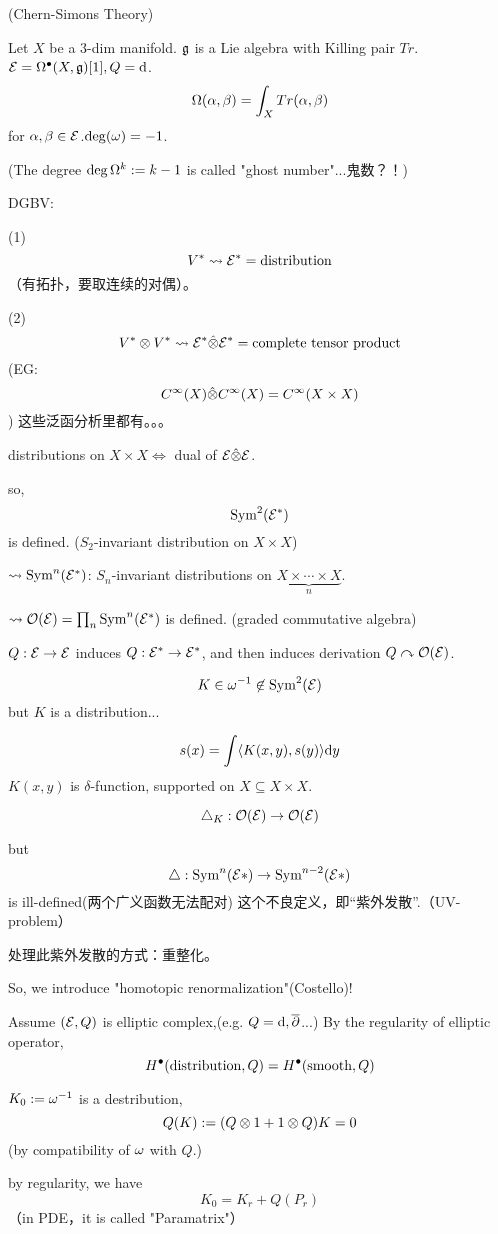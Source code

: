 \begin{example}(Chern-Simons Theory)

Let $X$ be a $3$-dim manifold. $\mathfrak{g}$ is a Lie algebra
with Killing pair $Tr$. $\mathcal{E}=\Omega^{\bullet}(X,\mathfrak{g})[1],Q=\mathrm{d}$.
$$\Omega(\alpha,\beta)=\int_XTr(\alpha,\beta)$$
for $\alpha,\beta\in\mathcal{E}$.$\deg(\omega)=-1$.
\end{example}
(The degree $\deg\Omega^k:=k-1$ is called "ghost number"...鬼数？！)

DGBV:

(1)
$$V^*\rightsquigarrow\mathcal{E}^*=\text{distribution}$$
（有拓扑，要取连续的对偶）。

(2)
$$V^*\otimes V^*\rightsquigarrow\mathcal{E}^*\hat{\otimes}\mathcal{E}^*=\text{complete tensor product}$$
(EG:$$C^\infty(X)\hat{\otimes}C^\infty(X)=C^{\infty}(X\times X)$$
)
这些泛函分析里都有。。。

distributions on $X\times X\iff$ dual of $\mathcal{E}\hat{\otimes}\mathcal{E}$.

so,
$$\operatorname{Sym}^2(\mathcal{E}^*)$$
is defined.
($S_2$-invariant distribution on $X\times X$)

$\rightsquigarrow\operatorname{Sym}^n(\mathcal{E}^*)$: $S_n$-invariant distributions on
$\underbrace{X\times\cdots\times X}_n$.

$\rightsquigarrow\mathcal{O}(\mathcal{E})=\prod_n\operatorname{Sym}^n(\mathcal{E}^*)$ is defined.
(graded commutative algebra)

$Q:\mathcal{E}\to\mathcal{E}$ induces $Q:\mathcal{E}^*\to\mathcal{E}^*$, and then
induces derivation $Q\curvearrowright\mathcal{O}(\mathcal{E})$.

$$K\in\omega^{-1}\not\in\operatorname{Sym}^2(\mathcal{E})$$
but $K$ is a distribution...

$$s(x)=\int\langle K(x,y),s(y)\rangle\mathrm{d} y$$
$K(x,y)$ is $\delta$-function, supported on $X\subseteq X\times X$.

$$\triangle_K:\mathcal{O}(\mathcal{E})\to\mathcal{O}(\mathcal{E})$$

but
$$\triangle:\operatorname{Sym}^n(\mathcal{E}*)\to\operatorname{Sym}^{n-2}(\mathcal{E}*)$$
is ill-defined(两个广义函数无法配对)
这个不良定义，即“紫外发散”.（UV-problem）

处理此紫外发散的方式：重整化。

So, we introduce "homotopic renormalization"(Costello)!

Assume $(\mathcal{E},Q)$ is elliptic complex,(e.g. $Q=\mathrm{d},\overline{\partial}$...)
By the regularity of elliptic operator,
$$H^{\bullet}(\text{distribution},Q)=H^{\bullet}(\text{smooth},Q)$$

$K_0:=\omega^{-1}$ is a destribution,
$$Q(K):=(Q\otimes 1+ 1\otimes Q)K=0$$
(by compatibility of $\omega$ with $Q$.)

by regularity, we have
$$K_0=K_r+Q(P_r)$$
（in PDE，it is called "Paramatrix"）

